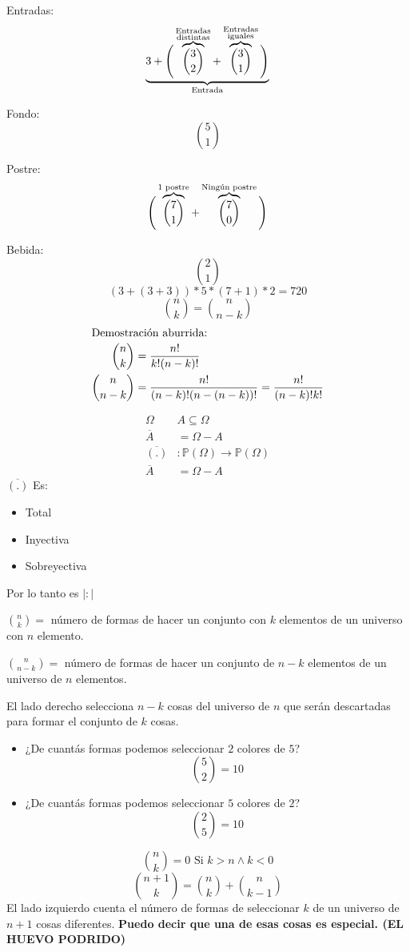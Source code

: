 \documentclass[../main.tex]{subfiles}
\begin{document}
Entradas:
\[
	\underbrace{3+\Bigg{(}\overbrace{\binom{3}{2}}^{\substack{\text{Entradas}\\\text{distintas}} }
	+\overbrace{\binom{3}{1}}^{\substack{\text{Entradas}\\\text{iguales}} }\Bigg{)}}_
	{\text{Entrada}}
\]

Fondo:
\[
	\binom{5}{1}
\]

Postre:
\[
	\Bigg{(}
	\overbrace{\binom{7}{1}}^{\text{$1$ postre}}+
	\overbrace{\binom{7}{0}}^{\text{Ningún postre}}
	\Bigg{)}
\]

Bebida:
\[
	\binom{2}{1}
\]
\[
	\boxed{(3+(3+3))*5*(7+1)*2=720}
\]
{\Huge
	\[
		\binom{n}{k} = \binom{n}{n-k}
	\]
}
\begin{align}
	\intertext{Demostración aburrida:}
	\binom{n}{k} &= \frac{n!}{k!(n-k)!} \\
	\binom{n}{n-k} &= \frac{n!}{(n-k)!(n-(n-k))!} = \frac{n!}{(n-k)!k!}
\end{align}

\begin{align*}
	\Omega \quad &A\subseteq\Omega\\
	\overline{A} &= \Omega-A\\
	\overline{(.)}&:\mathbb{P}(\Omega)\rightarrow\mathbb{P}(\Omega)\\
	\overline{A} &= \Omega -A
\end{align*}
$\overline{(.)}$ Es:
\begin{itemize}
	\item Total
	\item Inyectiva
	\item Sobreyectiva
\end{itemize}
Por lo tanto es $|:|$

$\binom{n}{k}=$ número de formas de hacer un conjunto con $k$ elementos
de un universo con $n$ elemento.

$\binom{n}{n-k}= $ número de formas de hacer un conjunto de $n-k$ elementos
de un universo de $n$ elementos.

{El lado derecho selecciona $n-k$ cosas del universo de $n$ que serán descartadas
para formar el conjunto de $k$ cosas.}

\begin{itemize}
	\item ¿De cuantás formas podemos seleccionar $2$ colores de $5$?
		\[\binom{5}{2}=10\]
	\item ¿De cuantás formas podemos seleccionar $5$ colores de $2$?
		\[\binom{2}{5}=10\]
\end{itemize}
\begin{figure}[H]
	\centering
	
\end{figure}
\[
	\binom{n}{k}= 0 \text{ Si } k>n\wedge k<0
\]
\[
	\binom{n+1}{k}=\binom{n}{k}+\binom{n}{k-1}
\]
El lado izquierdo cuenta el número de formas de seleccionar
$k$ de un universo de $n+1$ cosas diferentes.
\textbf{Puedo decir que una de esas cosas es especial. (EL HUEVO PODRIDO)}
\end{document}
